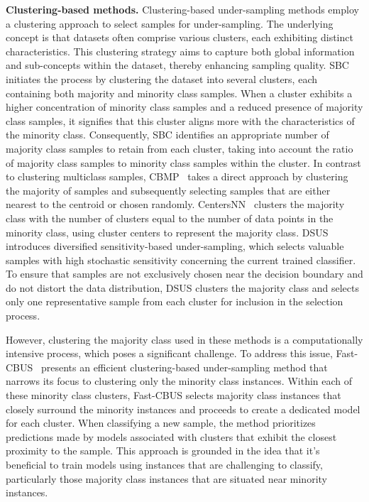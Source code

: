 \textbf{Clustering-based methods.} Clustering-based under-sampling methods employ a clustering approach to select samples for under-sampling. The underlying concept is that datasets often comprise various clusters, each exhibiting distinct characteristics. This clustering strategy aims to capture both global information and sub-concepts within the dataset, thereby enhancing sampling quality.
SBC~\cite{yen2009cluster} initiates the process by clustering the dataset into several clusters, each containing both majority and minority class samples. When a cluster exhibits a higher concentration of minority class samples and a reduced presence of majority class samples, it signifies that this cluster aligns more with the characteristics of the minority class. Consequently, SBC identifies an appropriate number of majority class samples to retain from each cluster, taking into account the ratio of majority class samples to minority class samples within the cluster.
In contrast to clustering multiclass samples, CBMP~\cite{zhang2010cluster} takes a direct approach by clustering the majority of samples and subsequently selecting samples that are either nearest to the centroid or chosen randomly. CentersNN~\cite{lin2017clustering} clusters the majority class with the number of clusters equal to the number of data points in the minority class, using cluster centers to represent the majority class. 
DSUS~\cite{ng2014diversified} introduces diversified sensitivity-based under-sampling, which selects valuable samples with high stochastic sensitivity concerning the current trained classifier. To ensure that samples are not exclusively chosen near the decision boundary and do not distort the data distribution, DSUS clusters the majority class and selects only one representative sample from each cluster for inclusion in the selection process. 

However, clustering the majority class used in these methods is a computationally intensive process, which poses a significant challenge. To address this issue, Fast-CBUS~\cite{ofek2017fast} presents an efficient clustering-based under-sampling method that narrows its focus to clustering only the minority class instances. Within each of these minority class clusters, Fast-CBUS selects majority class instances that closely surround the minority instances and proceeds to create a dedicated model for each cluster. When classifying a new sample, the method prioritizes predictions made by models associated with clusters that exhibit the closest proximity to the sample. This approach is grounded in the idea that it's beneficial to train models using instances that are challenging to classify, particularly those majority class instances that are situated near minority instances.



